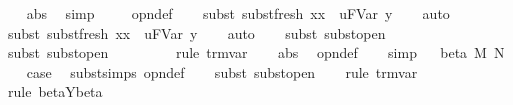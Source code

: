 \begin{isabellebody}
\ \ \isamarkupfalse%
\ abs\ \isamarkupfalse%
\ simp\ \isanewline
\ \ \isamarkupfalse%
\ opn{\isacharprime}{\isacharunderscore}def\isanewline
\ \ \isamarkupfalse%
\ {\isacharparenleft}subst\ subst{\isacharunderscore}fresh{}{\isacharbrackleft}\ x{\isacharequal}x\ \ u{\isacharequal}{\isachardoublequoteopen}FVar\ y{\isachardoublequoteclose}{\isacharbrackright}{\isacharparenright}\isanewline
\ \ \isamarkupfalse%
\ auto{\isacharbrackleft}{}{\isacharbrackright}\isanewline
\ \ \isamarkupfalse%
\ {\isacharparenleft}subst{\isacharparenleft}{}{\isacharparenright}\ subst{\isacharunderscore}fresh{}{\isacharbrackleft}\ x{\isacharequal}x\ \ u{\isacharequal}{\isachardoublequoteopen}FVar\ y{\isachardoublequoteclose}{\isacharbrackright}{\isacharparenright}\isanewline
\ \ \isamarkupfalse%
\ auto{\isacharbrackleft}{}{\isacharbrackright}\isanewline
\ \ \isamarkupfalse%
\ {\isacharparenleft}subst\ subst{\isacharunderscore}open{}{\isacharparenright}\isanewline
\ \ \isamarkupfalse%
\isanewline
\ \ \isamarkupfalse%
\ {\isacharparenleft}subst\ subst{\isacharunderscore}open{}{\isacharparenright}\isanewline
\ \ \isamarkupfalse%
\isanewline
\ \ \isamarkupfalse%
\isanewline
\ \ \isamarkupfalse%
\ {\isacharparenleft}rule\ trm{\isachardot}var{\isacharparenright}\isanewline
\ \ \isamarkupfalse%
\ abs\ \isamarkupfalse%
\ opn{\isacharprime}{\isacharunderscore}def\isanewline
\ \ \isamarkupfalse%
\ simp\isanewline
\ \isamarkupfalse%
\isanewline
{}\isamarkupfalse%
\ {\isacharparenleft}beta\ M\ N{\isacharparenright}\isanewline
\ \ \isamarkupfalse%
\ {\isacharquery}case\ \isamarkupfalse%
\ subst{\isachardot}simps\ opn{\isacharprime}{\isacharunderscore}def\isanewline
\ \ \isamarkupfalse%
\ {\isacharparenleft}subst\ subst{\isacharunderscore}open{\isacharparenright}\isanewline
\ \ \isamarkupfalse%
\ {\isacharparenleft}rule\ trm{\isachardot}var{\isacharparenright}\isanewline
\ \ \isamarkupfalse%
\ {\isacharparenleft}rule\ beta{\isacharunderscore}Y{\isacharunderscore}beta{\isacharprime}{\isacharparenright}\isanewline
\ \ \isamarkupfalse%

\end{isabellebody}
